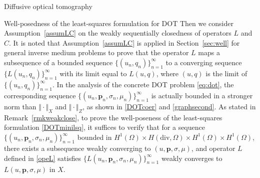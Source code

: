 \documentclass[11pt]{article}%
\renewcommand{\_}{{\fontfamily{ptm}\selectfont\textunderscore}}
\theoremstyle{plain}
\numberwithin{equation}{section}
\newcommand{\m}[1]{\ensuremath{\mathbf{#1}}}
\newcommand{\mm}[1]{{\color{blue}{#1}}}
\begin{document}
\begin{section}{Diffusive optical tomography}
\begin{subsection}{Well-posedness of the least-squares formulation for DOT}
Then we consider Assumption~\ref{assumLC} on the weakly sequentially closedness of operators $L$ and $C$. 
It is noted that Assumption~\ref{assumLC} is applied in Section~\ref{sec:well} for general inverse medium problems to prove that the operator $L$ maps a subsequence of a bounded sequence $\{(u_n, q_n)\}_{n=1}^\infty$ to a converging sequence $\{L(u_n,q_n)\}_{n=1}^\infty$ with its limit equal to $L(u,q)$, where $(u,q)$ is the limit of $\{(u_n, q_n)\}_{n=1}^\infty$.
 In the analysis of the concrete DOT problem \eqref{eq:dot}, the corresponding sequence $\{(u_n, \m{p}_n,\sigma_n,\mu_n)\}_{n=1}^\infty$ is actually bounded in a stronger norm than  $\Vert\cdot\Vert_X$ and $\Vert\cdot\Vert_Z$, as shown in \eqref{DOTcoer} and \eqref{graphsecond}. 
 As stated in Remark~\ref{rmkweakclose}, to prove the well-poseness of the least-squares formulation \eqref{DOTminilsq}, it suffices to verify that for a sequence $\{(u_n, \m{p}_n,\sigma_n,\mu_n)\}_{n=1}^\infty$ bounded in $H^1(\Omega)\times H(\text{div},\Omega)\times H^1(\Omega)\times H^1(\Omega)$, there exists a subsequence weakly converging to $(u,\m{p},\sigma,\mu)$, and operator $L$ defined in \eqref{opeL} satisfies $\{L(u_n, \m{p}_n,\sigma_n,\mu_n)\}_{n=1}^\infty$ weakly converges to $L(u, \m{p},\sigma,\mu)$ in $X$.
% 
%


\end{subsection}
\end{section}
\end{document}
